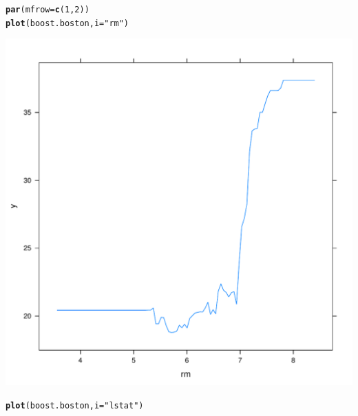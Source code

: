 \documentclass[12pt]{article}\usepackage[]{graphicx}\usepackage[]{color}
\makeatletter
\def\maxwidth{ %
  \ifdim\Gin@nat@width>\linewidth
    \linewidth
  \else
    \Gin@nat@width
  \fi
}
\newcommand{\hlnum}[1]{\textcolor[rgb]{0.686,0.059,0.569}{#1}}%
\newcommand{\hlstr}[1]{\textcolor[rgb]{0.192,0.494,0.8}{#1}}%
\newcommand{\hlstd}[1]{\textcolor[rgb]{0.345,0.345,0.345}{#1}}%
\newcommand{\hlkwc}[1]{\textcolor[rgb]{0.333,0.667,0.333}{#1}}%
\newcommand{\hlkwd}[1]{\textcolor[rgb]{0.737,0.353,0.396}{\textbf{#1}}}%
\newenvironment{kframe}{%
 \def\at@end@of@kframe{}%
 \ifinner\ifhmode%
  \def\at@end@of@kframe{\end{minipage}}%
  \begin{minipage}{\columnwidth}%
 \fi\fi%
 \def\FrameCommand##1{\hskip\@totalleftmargin \hskip-\fboxsep
 \colorbox{shadecolor}{##1}\hskip-\fboxsep
     \hskip-\linewidth \hskip-\@totalleftmargin \hskip\columnwidth}%
 \MakeFramed {\advance\hsize-\width
   \@totalleftmargin\z@ \linewidth\hsize
   \@setminipage}}%
 {\par\unskip\endMakeFramed%
 \at@end@of@kframe}
\newenvironment{knitrout}{}{} %
\makeatother
\begin{document}
\begin{knitrout}
\color{fgcolor}\begin{kframe}
\begin{alltt}
\hlkwd{par}\hlstd{(}\hlkwc{mfrow}\hlstd{=}\hlkwd{c}\hlstd{(}\hlnum{1}\hlstd{,}\hlnum{2}\hlstd{))}
\hlkwd{plot}\hlstd{(boost.boston,} \hlkwc{i}\hlstd{=}\hlstr{"rm"}\hlstd{)}
\end{alltt}
\end{kframe}
\includegraphics[width=\maxwidth]{figure/unnamed-chunk-26-1} 
\begin{kframe}\begin{alltt}
\hlkwd{plot}\hlstd{(boost.boston,} \hlkwc{i}\hlstd{=}\hlstr{"lstat"}\hlstd{)}
\end{alltt}
\end{kframe}

\end{knitrout}
\end{document}
